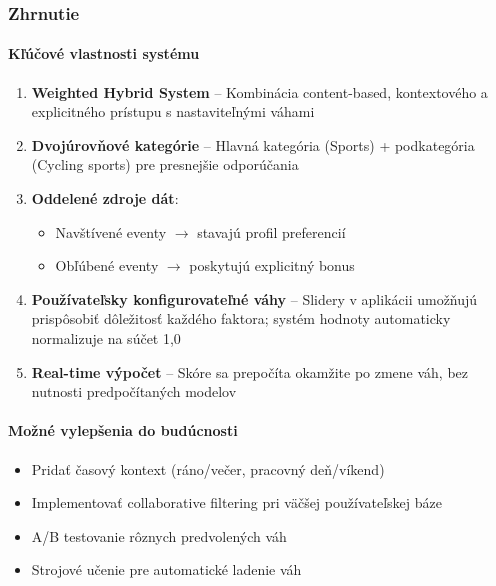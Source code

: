   \subsubsection{Zhrnutie}

  \paragraph{Kľúčové vlastnosti systému}

  \begin{enumerate}
      \item \textbf{Weighted Hybrid System} -- Kombinácia content-based,
            kontextového a explicitného prístupu s nastaviteľnými váhami

      \item \textbf{Dvojúrovňové kategórie} -- Hlavná kategória (Sports) +
            podkategória (Cycling sports) pre presnejšie odporúčania

      \item \textbf{Oddelené zdroje dát}:
      \begin{itemize}
          \item Navštívené eventy $\rightarrow$ stavajú profil preferencií
          \item Obľúbené eventy $\rightarrow$ poskytujú explicitný bonus
      \end{itemize}

      \item \textbf{Používateľsky konfigurovateľné váhy} -- Slidery
            v aplikácii umožňujú prispôsobiť dôležitosť každého faktora;
            systém hodnoty automaticky normalizuje na súčet 1,0

      \item \textbf{Real-time výpočet} -- Skóre sa prepočíta okamžite
            po zmene váh, bez nutnosti predpočítaných modelov
  \end{enumerate}

  \paragraph{Možné vylepšenia do budúcnosti}

  \begin{itemize}
      \item Pridať časový kontext (ráno/večer, pracovný deň/víkend)
      \item Implementovať collaborative filtering pri väčšej používateľskej báze
      \item A/B testovanie rôznych predvolených váh
      \item Strojové učenie pre automatické ladenie váh
  \end{itemize}